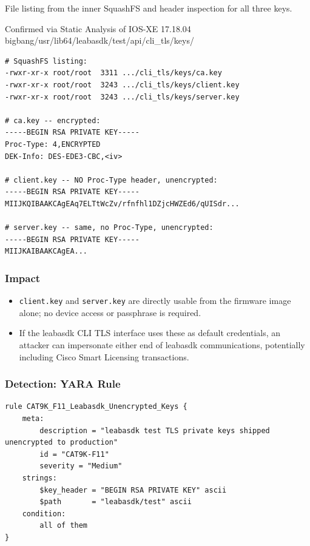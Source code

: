 \documentclass[11pt,a4paper]{article}
\begin{document}
File listing from the inner SquashFS and header inspection for all three keys.

\begin{pocbox}{Confirmed via Static Analysis of IOS-XE 17.18.04 bigbang/usr/lib64/leabasdk/test/api/cli\_tls/keys/}
\begin{lstlisting}
# SquashFS listing:
-rwxr-xr-x root/root  3311 .../cli_tls/keys/ca.key
-rwxr-xr-x root/root  3243 .../cli_tls/keys/client.key
-rwxr-xr-x root/root  3243 .../cli_tls/keys/server.key

# ca.key -- encrypted:
-----BEGIN RSA PRIVATE KEY-----
Proc-Type: 4,ENCRYPTED
DEK-Info: DES-EDE3-CBC,<iv>

# client.key -- NO Proc-Type header, unencrypted:
-----BEGIN RSA PRIVATE KEY-----
MIIJKQIBAAKCAgEAq7ELTtWcZv/rfnfhl1DZjcHWZEd6/qUISdr...

# server.key -- same, no Proc-Type, unencrypted:
-----BEGIN RSA PRIVATE KEY-----
MIIJKAIBAAKCAgEA...
\end{lstlisting}
\end{pocbox}

\subsubsection{Impact}

\begin{itemize}[nosep]
  \item \texttt{client.key} and \texttt{server.key} are directly usable from the
    firmware image alone; no device access or passphrase is required.
  \item If the leabasdk CLI TLS interface uses these as default credentials, an
    attacker can impersonate either end of leabasdk communications, potentially
    including Cisco Smart Licensing transactions.
\end{itemize}

\subsubsection{Detection: YARA Rule}

\begin{lstlisting}[style=yara]
rule CAT9K_F11_Leabasdk_Unencrypted_Keys {
    meta:
        description = "leabasdk test TLS private keys shipped unencrypted to production"
        id = "CAT9K-F11"
        severity = "Medium"
    strings:
        $key_header = "BEGIN RSA PRIVATE KEY" ascii
        $path       = "leabasdk/test" ascii
    condition:
        all of them
}
\end{lstlisting}
\end{document}
